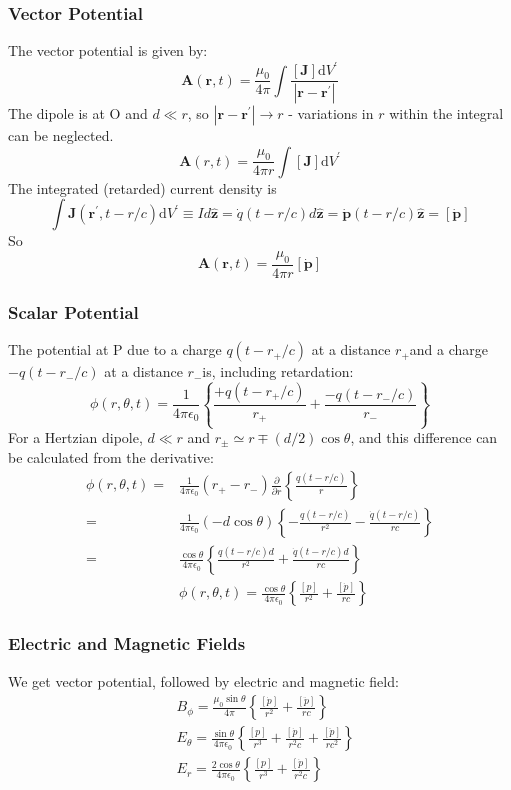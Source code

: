 \documentclass[12pt,a4paper]{article}
\begin{document}
\subsubsection{Vector Potential}
The vector potential is given by:
$$
\boldsymbol{A}(\boldsymbol{r}, t)=\frac{\mu_0}{4 \pi} \int \frac{[\boldsymbol{J}] \mathrm{d} V^{\prime}}{\left|\boldsymbol{r}-\boldsymbol{r}^{\prime}\right|}
$$
The dipole is at $\mathrm{O}$ and $d \ll r$, so $\left|\boldsymbol{r}-\boldsymbol{r}^{\prime}\right| \rightarrow r$ - variations in $r$ within the integral can be neglected.
$$
\boldsymbol{A}(r, t)=\frac{\mu_0}{4 \pi r} \int[\boldsymbol{J}] \mathrm{d} V^{\prime}
$$
The integrated (retarded) current density is
$$
\int \boldsymbol{J}\left(\boldsymbol{r}^{\prime}, t-r / c\right) \mathrm{d} V^{\prime} \equiv I d \widehat{\boldsymbol{z}}=\dot{q}(t-r / c) d \widehat{\boldsymbol{z}}=\dot{\boldsymbol{p}}(t-r / c) \widehat{\boldsymbol{z}}=[\dot{\boldsymbol{p}}]
$$
So
$$
\boldsymbol{A}(\boldsymbol{r}, t)=\frac{\mu_0}{4 \pi r}[\dot{\boldsymbol{p}}]
$$

\subsubsection{Scalar Potential}
The potential at $\mathrm{P}$ due to a charge $q\left(t-r_{+} / c\right)$ at a distance $r_{+}$and a charge $-q\left(t-r_{-} / c\right)$ at a distance $r_{-}$is, including retardation:
$$
\phi(r, \theta, t)=\frac{1}{4 \pi \epsilon_0}\left\{\frac{+q\left(t-r_{+} / c\right)}{r_{+}}+\frac{-q\left(t-r_{-} / c\right)}{r_{-}}\right\}
$$
For a Hertzian dipole, $d \ll r$ and $r_{ \pm} \simeq r \mp(d / 2) \cos \theta$, and this difference can be calculated from the derivative:
$$
\begin{aligned}
\phi(r, \theta, t)= & \frac{1}{4 \pi \epsilon_0}\left(r_{+}-r_{-}\right) \frac{\partial}{\partial r}\left\{\frac{q(t-r / c)}{r}\right\} \\
= & \frac{1}{4 \pi \epsilon_0}(-d \cos \theta)\left\{-\frac{q(t-r / c)}{r^2}-\frac{\dot{q}(t-r / c)}{r c}\right\} \\
= & \frac{\cos \theta}{4 \pi \epsilon_0}\left\{\frac{q(t-r / c) d}{r^2}+\frac{\dot{q}(t-r / c) d}{r c}\right\} \\
& \phi(r, \theta, t)=\frac{\cos \theta}{4 \pi \epsilon_0}\left\{\frac{[p]}{r^2}+\frac{[\dot{p}]}{r c}\right\}
\end{aligned}
$$
\subsubsection{Electric and Magnetic Fields}
We get vector potential, followed by electric and magnetic field:
$$
\begin{aligned}
& B_\phi=\frac{\mu_0 \sin \theta}{4 \pi}\left\{\frac{[\dot{p}]}{r^2}+\frac{[\ddot{p}]}{r c}\right\} \\
& E_\theta=\frac{\sin \theta}{4 \pi \epsilon_0}\left\{\frac{[p]}{r^3}+\frac{[\dot{p}]}{r^2 c}+\frac{[\ddot{p}]}{r c^2}\right\} \\
& E_r=\frac{2 \cos \theta}{4 \pi \epsilon_0}\left\{\frac{[p]}{r^3}+\frac{[\dot{p}]}{r^2 c}\right\}
\end{aligned}
$$
\end{document}
